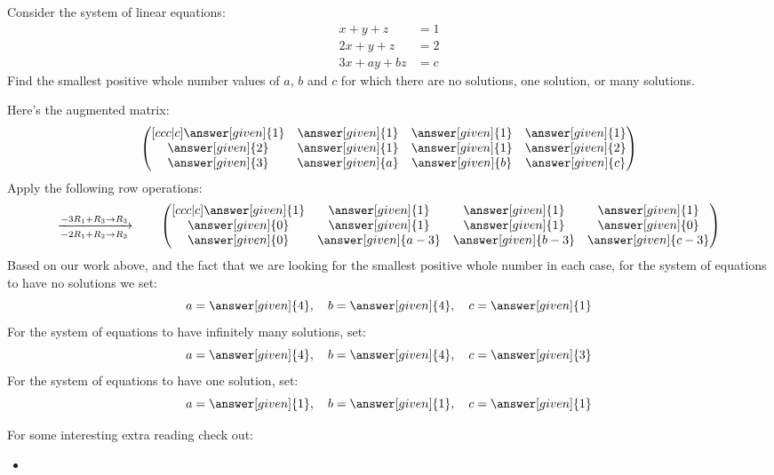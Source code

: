 \documentclass{ximera}
\begin{document}
\begin{example}
  Consider the system of linear equations:
  \begin{align*}
    x+y+z &=  1\\
    2x+y+z &=  2\\
    3x+ay+bz &= c
  \end{align*}
  Find the smallest positive whole number values of $a$, $b$ and $c$
  for which there are no solutions, one solution, or many solutions.
  \begin{explanation}
    Here's the augmented matrix:
    \[
      \begin{pmatrix}[ccc|c]
        \answer[given]{1} &  \answer[given]{1} &  \answer[given]{1} &  \answer[given]{1} \\
        \answer[given]{2} &  \answer[given]{1} &  \answer[given]{1} &  \answer[given]{2} \\
        \answer[given]{3} &  \answer[given]{a} &  \answer[given]{b} &  \answer[given]{c} \\
      \end{pmatrix}
    \]
    Apply the following row operations:
    \[
      \xrightarrow[-2R_{1} + R_{2}\rightarrow R_{2}]{-3R_{1}+R_{3}\rightarrow R_{3}}\qquad
      \begin{pmatrix}[ccc|c]
        \answer[given]{1} &  \answer[given]{1} &  \answer[given]{1} &  \answer[given]{1} \\
        \answer[given]{0} &  \answer[given]{1} &  \answer[given]{1} &  \answer[given]{0} \\
        \answer[given]{0} &  \answer[given]{a-3} &  \answer[given]{b-3} &  \answer[given]{c-3}
      \end{pmatrix}
    \]
    Based on our work above, and the fact that we are looking for the
    smallest positive whole number in each case, for the system of
    equations to have no solutions we set:
    \[
    a = \answer[given]{4}, \quad b = \answer[given]{4}, \quad c = \answer[given]{1}
    \]
    For the system of equations to have infinitely many solutions,
    set:
    \[
    a = \answer[given]{4}, \quad b = \answer[given]{4}, \quad c = \answer[given]{3}
    \]
    For the system of equations to have one solution, set:
    \[
    a = \answer[given]{1}, \quad b = \answer[given]{1}, \quad c = \answer[given]{1}
    \]
  \end{explanation}
\end{example}


For some interesting extra reading check out:
\begin{itemize}
\item {}
\end{itemize}
\end{document}
